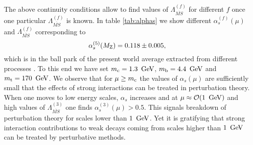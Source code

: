 \documentclass[12pt,rotate]{article}
\newcommand{\mt}{m_{\rm t}}
\newcommand{\mc}{m_{\rm c}}
\newcommand{\mb}{m_{\rm b}}
\newcommand{\mz}{M_{\rm Z}}
\newcommand{\gev}{\, {\rm GeV}}
\begin{document}
\begin{itemize}
\begin{itemize}
The above continuity conditions allow to find values of 
$\Lambda^{(f)}_{\overline{MS}}$
for different $f$ once one particular $\Lambda^{(f)}_{\overline{MS}}$
is known. In table \ref{tab:alphas} we show different 
$\alpha^{(f)}_s(\mu)$ and
$\Lambda^{(f)}_{\overline{MS}}$ corresponding to
\begin{equation}\label{asexp}
\alpha_s^{(5)}(\mz)=0.118 \pm 0.005,
\end{equation}
which is in the ball park of the present world average extracted from
different processes \cite{Schmelling}.
To this end we have set
$\mc=1.3~\gev$, $\mb=4.4~\gev$ and $\mt=170~\gev$.
We observe that for $\mu\geq\mc $ the values of
$\alpha_s(\mu)$ are sufficiently small that
the effects of strong interactions can be
treated in perturbation theory. When one
moves to low energy scales, $\alpha_s$ increases and at
$\mu\approx {\cal O}(1~\gev)$ and high values of 
$\Lambda^{(3)}_{\overline{MS}}$  one finds
$\alpha_s^{(3)}(\mu)>0.5$. This signals breakdown of
perturbation theory for scales lower than $1~\gev$. Yet it is
gratifying that strong interaction contributions to weak decays coming
from scales higher than $1~\gev$ can be treated by perturbative
methods.


\end{itemize}
\end{itemize}
\end{document}
